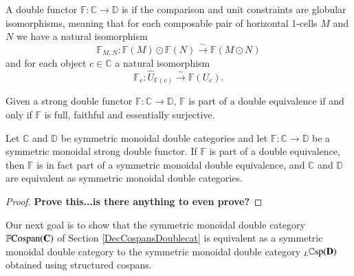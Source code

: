 \documentclass{amsart}
\begin{document}
\begin{defn}
A double functor $\mathbb{F} \colon \mathbb{C} \to \mathbb{D}$ is  if the comparison and unit constraints are globular isomorphisms, meaning that for each composable pair of horizontal 1-cells $M$ and $N$ we have a natural isomorphism $$\mathbb{F}_{M,N} \colon \mathbb{F}(M) \odot \mathbb{F}(N) \xrightarrow{\sim} \mathbb{F}(M \odot N)$$and for each object $c \in \mathbb{C}$ a natural isomorphism $$\mathbb{F}_c \colon \hat{U}_{\mathbb{F}(c)} \xrightarrow{\sim} \mathbb{F}(U_c).$$
\end{defn}
\begin{thm}[Shulman,7.8]\label{ShulDubEquiv}
Given a strong double functor $\mathbb{F} \colon \mathbb{C} \to \mathbb{D}$, $\mathbb{F}$ is part of a double equivalence if and only if $\mathbb{F}$ is full, faithful and essentially surjective.
\end{thm}
\begin{thm}
Let $\mathbb{C}$ and $\mathbb{D}$ be symmetric monoidal double categories and let $\mathbb{F} \colon \mathbb{C} \to \mathbb{D}$ be a symmetric monoidal strong double functor. If $\mathbb{F}$ is part of a double equivalence, then $\mathbb{F}$ is in fact part of a symmetric monoidal double equivalence, and $\mathbb{C}$ and $\mathbb{D}$ are equivalent as symmetric monoidal double categories.
\end{thm}
\begin{proof}
\textbf{Prove this...is there anything to even prove?}
\end{proof}
Our next goal is to show that the symmetric monoidal double category $\mathbb{F}\textnormal{Cospan}(\bold{C})$ of Section \ref{DecCospansDoublecat} is equivalent as a symmetric monoidal double category to the symmetric monoidal double category $_L \mathbb{C}\textnormal{sp}(\bold{D})$ obtained using structured cospans.
\end{document}
